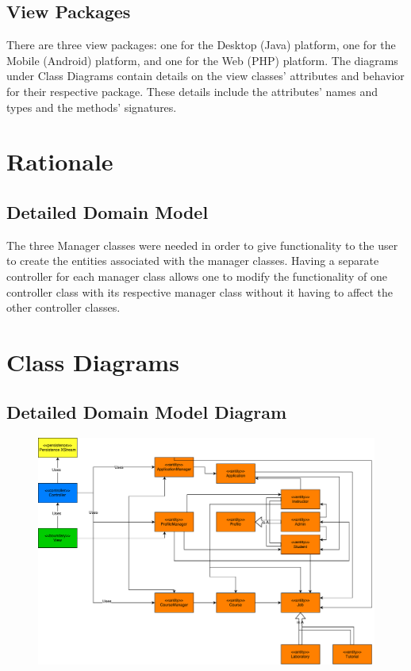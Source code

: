 \documentclass[12pt]{article}
\begin{document}
\subsection{View Packages}
There are three view packages: one for the Desktop (Java) platform, one for the Mobile (Android) platform, and one for the Web (PHP) platform. The diagrams under Class Diagrams contain details on the view classes' attributes and behavior for their respective package. These details include the attributes' names and types and the methods' signatures.
\section{Rationale}
\subsection{Detailed Domain Model}
The three Manager classes were needed in order to give functionality to the user to create the entities associated with the manager classes. Having a separate controller for each manager class allows one to modify the functionality of one controller class with its respective manager class without it having to affect the other controller classes.
\section{Class Diagrams}
\subsection{Detailed Domain Model Diagram}
\begin{figure}[H]
	\centering
	\includegraphics[width =1\textwidth]{./ClassDiagrams/DetailedDomainModelDiagram.pdf}
\end{figure}
\end{document}
